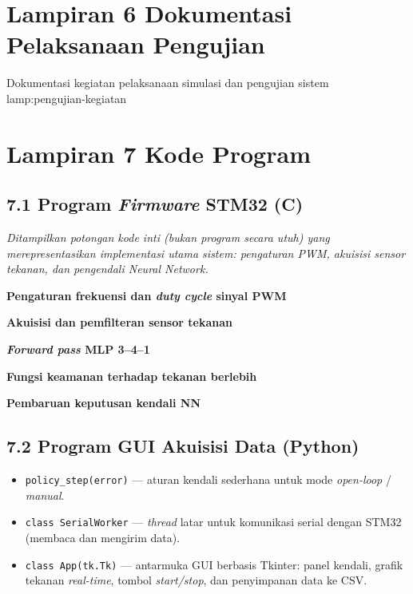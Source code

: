 \section*{Lampiran 6 \quad Dokumentasi Pelaksanaan Pengujian}

  {Dokumentasi kegiatan pelaksanaan simulasi dan pengujian sistem}
  {lamp:pengujian-kegiatan}

\section*{Lampiran 7 \quad Kode Program}

\subsection*{7.1 \quad Program \emph{Firmware} STM32 (C)}
\noindent\textit{Ditampilkan potongan kode inti (bukan program secara utuh) yang merepresentasikan implementasi utama sistem: pengaturan PWM, akuisisi sensor tekanan, dan pengendali \emph{Neural Network}.}

\vspace{1ex}
\noindent\textbf{Pengaturan frekuensi dan \emph{duty cycle} sinyal PWM}


\noindent\textbf{Akuisisi dan pemfilteran sensor tekanan}


\noindent\textbf{\emph{Forward pass} MLP 3--4--1}


\noindent\textbf{Fungsi keamanan terhadap tekanan berlebih}


\noindent\textbf{Pembaruan keputusan kendali NN}


\subsection*{7.2 \quad Program GUI Akuisisi Data (Python)}
\begin{itemize}
  \item \texttt{policy\_step(error)} --- aturan kendali sederhana untuk mode \emph{open-loop} / \emph{manual}.
  \item \texttt{class SerialWorker} --- \emph{thread} latar untuk komunikasi serial dengan STM32 (membaca dan mengirim data).
  \item \texttt{class App(tk.Tk)} --- antarmuka GUI berbasis Tkinter: panel kendali, grafik tekanan \emph{real-time}, tombol \emph{start/stop}, dan penyimpanan data ke CSV.
\end{itemize}

